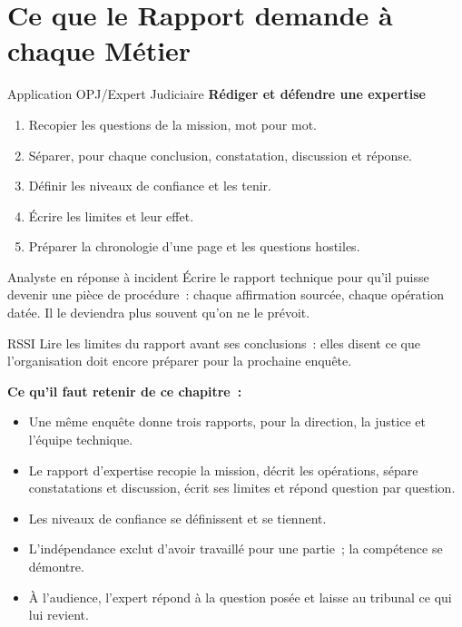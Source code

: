 \section{Ce que le Rapport demande à chaque Métier}
\label{sec:c15-metiers}

\begin{boxmetier}{Application OPJ/Expert Judiciaire}
\textbf{Rédiger et défendre une expertise}
\begin{enumerate}
    \item Recopier les questions de la mission, mot pour mot.
    \item Séparer, pour chaque conclusion, constatation, discussion et
          réponse.
    \item Définir les niveaux de confiance et les tenir.
    \item Écrire les limites et leur effet.
    \item Préparer la chronologie d'une page et les questions hostiles.
\end{enumerate}
\end{boxmetier}

\begin{boxmetier}{Analyste en réponse à incident}
Écrire le rapport technique pour qu'il puisse devenir une pièce de
procédure~: chaque affirmation sourcée, chaque opération datée. Il le
deviendra plus souvent qu'on ne le prévoit.
\end{boxmetier}

\begin{boxmetier}{RSSI}
Lire les limites du rapport avant ses conclusions~: elles disent ce que
l'organisation doit encore préparer pour la prochaine enquête.
\end{boxmetier}

\separateur

\begin{boxresume}
\textbf{Ce qu'il faut retenir de ce chapitre~:}
\begin{itemize}
    \item Une même enquête donne trois rapports, pour la direction, la
          justice et l'équipe technique.
    \item Le rapport d'expertise recopie la mission, décrit les opérations,
          sépare constatations et discussion, écrit ses limites et répond
          question par question.
    \item Les niveaux de confiance se définissent et se tiennent.
    \item L'indépendance exclut d'avoir travaillé pour une partie~; la
          compétence se démontre.
    \item À l'audience, l'expert répond à la question posée et laisse au
          tribunal ce qui lui revient.
\end{itemize}
\end{boxresume}


